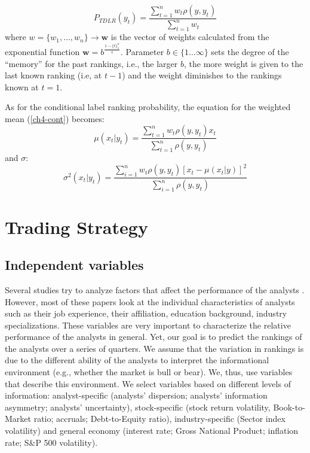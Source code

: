 \documentclass{llncs}\usepackage[]{graphicx}\usepackage[]{color}
\begin{document}
\begin{equation}
P_{TDLR}(y_t) =\frac{\sum_{t=1}^{n}  w_t \rho(y,y_t)}{ \sum_{t=1}^{n} w_t  }
\label{ch4-eq:timing}
\end{equation}
where $w = \{w_1, \ldots, w_{n}\} \rightarrow \mathbf{w}$  is the vector of weights calculated from the exponential function $\mathbf{w}=b ^{\frac{1-\{t\}_{1}^n }{t}}$. Parameter $b \in  \{1 \ldots \infty\}$ sets the degree of the ``memory'' for the past rankings, i.e.,  the larger $b$, the more weight is given to the last known ranking (i.e, at $t-1$)  and the weight diminishes to the rankings known at $t=1$. %

As for the conditional label ranking probability, the equation for the weighted mean (\ref{ch4-cont}) becomes:
\begin{equation}
\label{ch4-mu.w}
\mu(x_{t}|y_t) = \frac{\sum_{t=1}^n  w_t \rho(y,y_t) x_{t}}{\sum_{t=1}^n \rho(y,y_t)}
\end{equation}
and $\sigma$:
\begin{equation}
\label{ch4-sigma}
\sigma^2(x_{t}|y_t)=\frac{\sum_{i=1}^n w_{t} \rho(y,y_t) [x_{t}-\mu(x_{t}|y)]^2}{\sum_{i=1}^n \rho(y,y_t)}
\end{equation}

\section{Trading Strategy}
\label{ch4-sec:trading}
\subsection{Independent variables}
\label{ch4-sec:ind.var}

Several studies try to analyze  factors that affect the performance of the analysts \cite{clement1999,jegadeesh2004}.  However, most of these papers look at the individual characteristics of analysts such as their job experience, their affiliation,  education background, industry specializations. These variables are very important to characterize the relative performance of the analysts in general. Yet, our goal is to predict the rankings of the analysts over a series of quarters. We assume that the variation in rankings is due to the different ability of the analysts to interpret the informational environment (e.g., whether the market is bull or bear). We, thus, use variables that describe this environment. We select  variables based on different levels of information: analyst-specific (analysts' dispersion; analysts' information asymmetry; analysts' uncertainty), stock-specific (stock return volatility, Book-to-Market ratio; accruals; Debt-to-Equity ratio), industry-specific (Sector index volatility) and general economy (interest rate; Gross National Product; inflation rate; S\&P 500 volatility).
\end{document}

